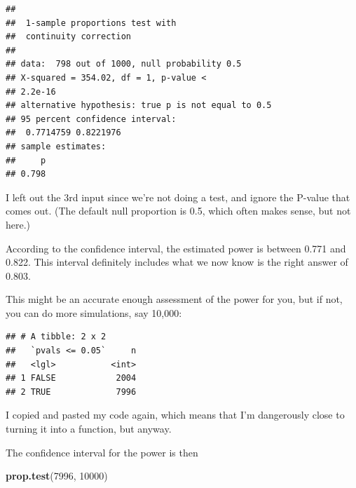 \documentclass[]{tufte-book}
\newenvironment{Shaded}{}{}
\newcommand{\DataTypeTok}[1]{\textcolor[rgb]{0.56,0.13,0.00}{#1}}
\newcommand{\DecValTok}[1]{\textcolor[rgb]{0.25,0.63,0.44}{#1}}
\newcommand{\FloatTok}[1]{\textcolor[rgb]{0.25,0.63,0.44}{#1}}
\newcommand{\KeywordTok}[1]{\textcolor[rgb]{0.00,0.44,0.13}{\textbf{#1}}}
\newcommand{\NormalTok}[1]{#1}
\newcommand{\OperatorTok}[1]{\textcolor[rgb]{0.40,0.40,0.40}{#1}}
\newcommand{\StringTok}[1]{\textcolor[rgb]{0.25,0.44,0.63}{#1}}
\theoremstyle{definition}
\theoremstyle{definition}
\theoremstyle{definition}
\theoremstyle{remark}
\begin{document}
\begin{verbatim}
## 
##  1-sample proportions test with
##  continuity correction
## 
## data:  798 out of 1000, null probability 0.5
## X-squared = 354.02, df = 1, p-value <
## 2.2e-16
## alternative hypothesis: true p is not equal to 0.5
## 95 percent confidence interval:
##  0.7714759 0.8221976
## sample estimates:
##     p 
## 0.798
\end{verbatim}

I left out the 3rd input since we're not doing a test, and ignore the
P-value that comes out. (The default null proportion is 0.5, which often
makes sense, but not here.)

According to the confidence interval, the estimated power is between
0.771 and 0.822. This interval definitely includes what we now know is
the right answer of 0.803.

This might be an accurate enough assessment of the power for you, but if
not, you can do more simulations, say 10,000:

\begin{Shaded}
\end{Shaded}

\begin{verbatim}
## # A tibble: 2 x 2
##   `pvals <= 0.05`     n
##   <lgl>           <int>
## 1 FALSE            2004
## 2 TRUE             7996
\end{verbatim}

I copied and pasted my code again, which means that I'm dangerously
close to turning it into a function, but anyway.

The confidence interval for the power is then

\begin{Shaded}
\begin{Highlighting}[]
\KeywordTok{prop.test}\NormalTok{(}\DecValTok{7996}\NormalTok{, }\DecValTok{10000}\NormalTok{)}
\end{Highlighting}
\end{Shaded}
\end{document}
